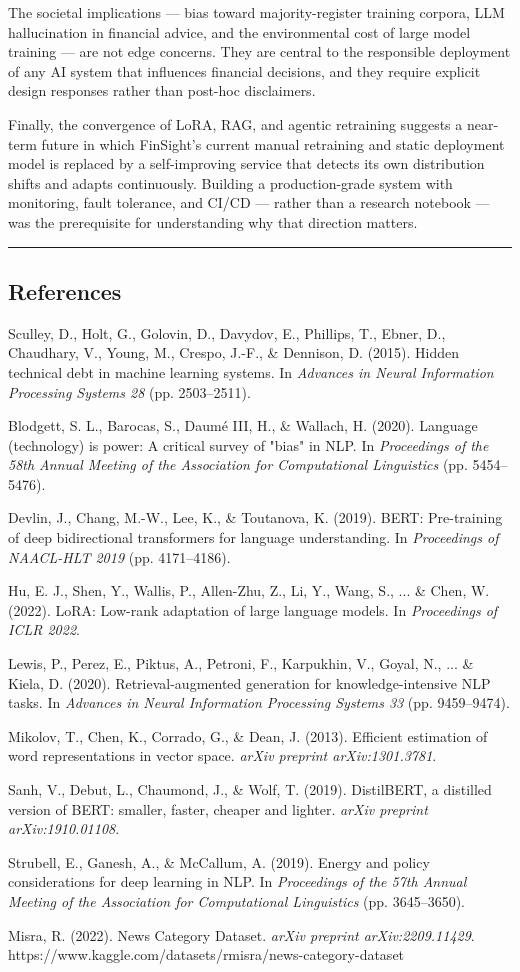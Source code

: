 \documentclass[11pt,a4paper]{article}
\begin{document}
The societal implications — bias toward majority-register training corpora, LLM hallucination in financial advice, and the environmental cost of large model training — are not edge concerns. They are central to the responsible deployment of any AI system that influences financial decisions, and they require explicit design responses rather than post-hoc disclaimers.

Finally, the convergence of LoRA, RAG, and agentic retraining suggests a near-term future in which FinSight's current manual retraining and static deployment model is replaced by a self-improving service that detects its own distribution shifts and adapts continuously. Building a production-grade system with monitoring, fault tolerance, and CI/CD — rather than a research notebook — was the prerequisite for understanding why that direction matters.

\noindent\rule{\linewidth}{0.4pt}

\subsection*{References}

Sculley, D., Holt, G., Golovin, D., Davydov, E., Phillips, T., Ebner, D., Chaudhary, V., Young, M., Crespo, J.-F., \& Dennison, D. (2015). Hidden technical debt in machine learning systems. In \textit{Advances in Neural Information Processing Systems 28} (pp. 2503--2511).

Blodgett, S. L., Barocas, S., Daumé III, H., \& Wallach, H. (2020). Language (technology) is power: A critical survey of "bias" in NLP. In \textit{Proceedings of the 58th Annual Meeting of the Association for Computational Linguistics} (pp. 5454–5476).

Devlin, J., Chang, M.-W., Lee, K., \& Toutanova, K. (2019). BERT: Pre-training of deep bidirectional transformers for language understanding. In \textit{Proceedings of NAACL-HLT 2019} (pp. 4171–4186).

Hu, E. J., Shen, Y., Wallis, P., Allen-Zhu, Z., Li, Y., Wang, S., ... \& Chen, W. (2022). LoRA: Low-rank adaptation of large language models. In \textit{Proceedings of ICLR 2022}.

Lewis, P., Perez, E., Piktus, A., Petroni, F., Karpukhin, V., Goyal, N., ... \& Kiela, D. (2020). Retrieval-augmented generation for knowledge-intensive NLP tasks. In \textit{Advances in Neural Information Processing Systems 33} (pp. 9459–9474).

Mikolov, T., Chen, K., Corrado, G., \& Dean, J. (2013). Efficient estimation of word representations in vector space. \textit{arXiv preprint arXiv:1301.3781}.

Sanh, V., Debut, L., Chaumond, J., \& Wolf, T. (2019). DistilBERT, a distilled version of BERT: smaller, faster, cheaper and lighter. \textit{arXiv preprint arXiv:1910.01108}.

Strubell, E., Ganesh, A., \& McCallum, A. (2019). Energy and policy considerations for deep learning in NLP. In \textit{Proceedings of the 57th Annual Meeting of the Association for Computational Linguistics} (pp. 3645–3650).

Misra, R. (2022). News Category Dataset. \textit{arXiv preprint arXiv:2209.11429}. https://www.kaggle.com/datasets/rmisra/news-category-dataset
\end{document}
